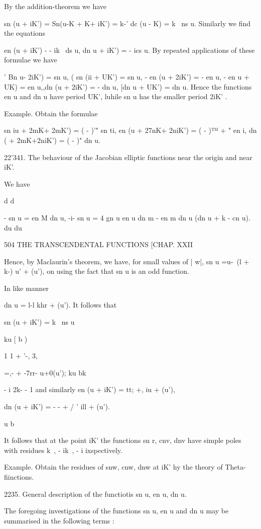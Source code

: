 By the addition-theorem we have

sn (u + iK') = Sn(u-K + K+ iK') = k-' dc (u - K) = k~ ns u. Similarly
we find the equations

en (u + iK') - - ik~ ds u, dn u + iK') = - ics u. By repeated
applications of these formulae we have

' Bn u- 2iK') = sn u, ( sn (ii + UK') = sn u, - en (u + 2iK') = - en
u, - en u + UK) = en u,,dn (u + 2iK') = - dn u, [dn u + UK') = dn u.
Hence the functions en u and dn u have period UK', luhile sn u has the
smaller period 2iK' .

Example. Obtain the formulae

sn iu + 2mK+ 2mK') = ( - )'" sn ti, en (u + 27nK+ 2niK') = ( - )™ + "
en i, dn ( + 2mK+2niK') = ( - )" dn u.

22'341. The behaviour of the Jacobian elliptic functions near the
origin and near iK'.

We have

d d

- sn u = en M dn u, -i- sn u = 4 gn u en u dn m - en m dn u (dn u + k
- cn u). du du

504 THE TRANSCENDENTAL FUNCTIONS [CHAP. XXII

Hence, by Maclaurin's theorem, we have, for small values of | w|, sn u
=u-~(l + k-) u' + (u'), on using the fact that sn u is an odd
function.

In like manner

dn u = l-l khr + (u'). It follows that

sn (u + iK') = k~ ns u

ku [ b )

1 1 + '-, 3,

=,- + -7rr- u+0(u'); ku bk

- i 2k- - 1 and similarly en (u + iK') = tt; +, iu + (u'),

dn (u + iK') = - - + / ' ill + (u').

u b

It follows that at the point iK' the functions sn r, cnv, dnv have
simple poles with residues k~, - ik~, - i ixspectively.

Example. Obtain the residues of snw, cnw, dnw at iK' hy the theory of
Theta- fiinctions.

2235. General description of the functiotis sn u, en u, dn u.

The foregoing investigations of the functions sn u, en u and dn u may
be summarised in the following terms :

